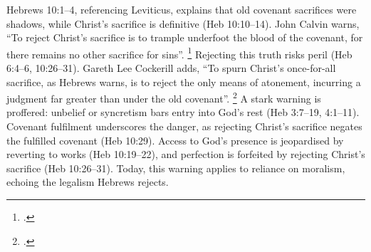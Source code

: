\documentclass[12pt]{article}
\begin{document}
Hebrews 10:1--4, referencing Leviticus, explains that old covenant sacrifices
were shadows, while Christ’s sacrifice is definitive (Heb 10:10--14). John
Calvin warns, ``To reject Christ’s sacrifice is to trample underfoot the blood
of the covenant, for there remains no other sacrifice for sins''.
\footcite[245]{Calvin1853}
Rejecting this truth risks peril (Heb 6:4--6, 10:26--31).
%
Gareth Lee Cockerill adds, ``To spurn Christ’s once-for-all sacrifice, as
Hebrews warns, is to reject the only means of atonement, incurring a judgment
far greater than under the old covenant''. \footcite[482]{Cockerill2012}
%
A stark warning is proffered:
unbelief or syncretism bars entry into God’s rest (Heb 3:7--19, 4:1--11).
%
Covenant fulfilment underscores the danger, as rejecting Christ’s sacrifice
negates the fulfilled covenant (Heb 10:29).
%
Access to God’s presence is jeopardised by reverting to works (Heb 10:19--22),
and perfection is forfeited by rejecting Christ’s sacrifice (Heb 10:26--31).
%
Today, this warning applies to reliance on moralism, echoing the legalism
Hebrews rejects.
\end{document}
